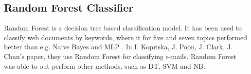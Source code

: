 \subsection{Random Forest Classifier}
Random Forest is a decision tree based classification model. It has been used to classify web documents by keywords, where it for five and seven topics performed better than e.g. Naive Bayes and MLP \cite{keywords}. In I. Kopriska, J. Poon, J. Clark, J. Chan's paper, they use Random Forest for classifying e-mails. Random Forest was able to out perform other methods, such as DT, SVM and NB\cite{email}.